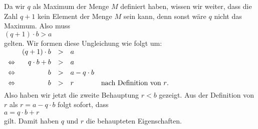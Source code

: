 Da wir $q$ als Maximum der Menge $M$ definiert haben, wissen wir weiter, dass
die Zahl $q + 1$ kein Element der Menge $M$ sein kann, denn sonst wäre $q$ nicht das Maximum.
Also muss
\\[0.2cm]
\hspace*{1.3cm}
$(q+1) \cdot b > a$
\\[0.2cm]
gelten.  Wir formen diese Ungleichung wie folgt um:
\\[0.2cm]
\hspace*{1.3cm}
$
\begin{array}[t]{lrcll}
                & (q + 1) \cdot b & > & a                  \\[0.1cm]   
\Leftrightarrow & q \cdot b + b   & > & a                  \\[0.1cm]   
\Leftrightarrow & b               & > & a - q \cdot b      \\[0.1cm]   
\Leftrightarrow & b               & > & r & \mbox{nach Definition von $r$}. \\[0.1cm]   
\end{array}
$
\\[0.2cm]
Also haben wir jetzt die zweite Behauptung $r < b$ gezeigt.
Aus der Definition von $r$ als $r = a - q \cdot b$ folgt sofort, dass
\\[0.2cm]
\hspace*{1.3cm}
$a = q \cdot b + r$ 
\\[0.2cm]
gilt.  Damit haben $q$ und $r$ die behaupteten Eigenschaften.
\vspace*{0.2cm}

